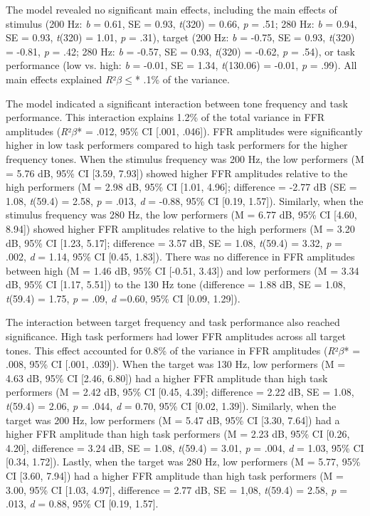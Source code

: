 The model revealed no significant main effects, including the main effects of stimulus (200 Hz: \textit{b} = 0.61, SE = 0.93, \textit{t}(320) = 0.66, \textit{p} = .51; 280 Hz: \textit{b} = 0.94, SE = 0.93, \textit{t}(320) = 1.01, \textit{p} = .31), target (200 Hz: \textit{b} = -0.75, SE = 0.93, \textit{t}(320) = -0.81, \textit{p} = .42; 280 Hz: \textit{b} = -0.57, SE = 0.93, \textit{t}(320) = -0.62, \textit{p} = .54), or task performance (low vs. high: \textit{b} = -0.01, SE = 1.34, \textit{t}(130.06) = -0.01, \textit{p} = .99). All main effects explained \textit{R}²$\beta \leq$* .1\% of the variance.

The model indicated a significant interaction between tone frequency and task performance. This interaction explains 1.2\% of the total variance in FFR amplitudes (\textit{R}²$\beta$* = .012, 95\% CI [.001, .046]). FFR amplitudes were significantly higher in low task performers compared to high task performers for the higher frequency tones. When the stimulus frequency was 200 Hz, the low performers (M = 5.76 dB, 95\% CI [3.59, 7.93]) showed higher FFR amplitudes relative to the high performers (M = 2.98 dB, 95\% CI [1.01, 4.96]; difference = -2.77 dB (SE = 1.08, \textit{t}(59.4) = 2.58, \textit{p} = .013, \textit{d} = -0.88, 95\% CI [0.19, 1.57]). Similarly, when the stimulus frequency was 280 Hz, the low performers (M = 6.77 dB, 95\% CI [4.60, 8.94]) showed higher FFR amplitudes relative to the high performers (M = 3.20 dB, 95\% CI [1.23, 5.17]; difference = 3.57 dB, SE = 1.08, \textit{t}(59.4) = 3.32, \textit{p} = .002, \textit{d} = 1.14, 95\% CI [0.45, 1.83]). There was no difference in FFR amplitudes between high (M = 1.46 dB, 95\% CI [-0.51, 3.43]) and low performers (M = 3.34 dB, 95\% CI [1.17, 5.51]) to the 130 Hz tone (difference = 1.88 dB, SE = 1.08, \textit{t}(59.4) = 1.75, \textit{p} = .09, \textit{d} =0.60, 95\% CI [0.09, 1.29]).

The interaction between target frequency and task performance also reached significance. High task performers had lower FFR amplitudes across all target tones. This effect accounted for 0.8\% of the variance in FFR amplitudes (\textit{R}²$\beta$* = .008, 95\% CI [.001, .039]). When the target was 130 Hz, low performers (M = 4.63 dB, 95\% CI [2.46, 6.80]) had a higher FFR amplitude than high task performers (M = 2.42 dB, 95\% CI [0.45, 4.39]; difference = 2.22 dB, SE = 1.08, \textit{t}(59.4) = 2.06, \textit{p} = .044, \textit{d} = 0.70, 95\% CI [0.02, 1.39]). Similarly, when the target was 200 Hz, low performers (M = 5.47 dB, 95\% CI [3.30, 7.64]) had a higher FFR amplitude than high task performers (M = 2.23 dB, 95\% CI [0.26, 4.20], difference = 3.24 dB, SE = 1.08, \textit{t}(59.4) = 3.01, \textit{p} = .004, \textit{d} = 1.03, 95\% CI [0.34, 1.72]). Lastly, when the target was 280 Hz, low performers (M = 5.77, 95\% CI [3.60, 7.94]) had a higher FFR amplitude than high task performers (M = 3.00, 95\% CI [1.03, 4.97], difference = 2.77 dB, SE = 1,08, \textit{t}(59.4) = 2.58, \textit{p} = .013, \textit{d} = 0.88, 95\% CI [0.19, 1.57].

